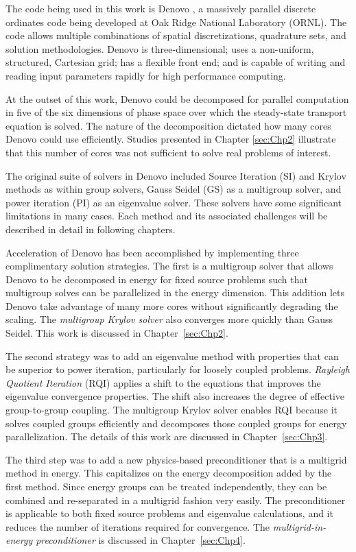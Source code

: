 The code being used in this work is Denovo \cite{Evans2009}, a massively parallel discrete ordinates code being developed at Oak Ridge National Laboratory (ORNL). The code allows multiple combinations of spatial discretizations, quadrature sets, and solution methodologies. Denovo is three-dimensional; uses a non-uniform, structured, Cartesian grid; has a flexible front end; and is capable of writing and reading input parameters rapidly for high performance computing. 

At the outset of this work, Denovo could be decomposed for parallel computation in five of the six dimensions of phase space over which the steady-state transport equation is solved. The nature of the decomposition dictated how many cores Denovo could use efficiently. Studies presented in Chapter \ref{sec:Chp2} illustrate that this number of cores was not sufficient to solve real problems of interest. 

The original suite of solvers in Denovo included Source Iteration (SI) and Krylov methods as within group solvers, Gauss Seidel (GS) as a multigroup solver, and power iteration (PI) as an eigenvalue solver. These solvers have some significant limitations in many cases. Each method and its associated challenges will be described in detail in following chapters. 

Acceleration of Denovo has been accomplished by implementing three complimentary solution strategies. The first is a multigroup solver that allows Denovo to be decomposed in energy for fixed source problems such that multigroup solves can be parallelized in the energy dimension. This addition lets Denovo take advantage of many more cores without significantly degrading the scaling. The \emph{multigroup Krylov solver} also converges more quickly than Gauss Seidel. This work is discussed in Chapter~\ref{sec:Chp2}.

The second strategy was to add an eigenvalue method with properties that can be superior to power iteration, particularly for loosely coupled problems. \emph{Rayleigh Quotient Iteration} (RQI) applies a shift to the equations that improves the eigenvalue convergence properties. The shift also increases the degree of effective group-to-group coupling. The multigroup Krylov solver enables RQI because it solves coupled groups efficiently and decomposes those coupled groups for energy parallelization. The details of this work are discussed in Chapter~\ref{sec:Chp3}.

The third step was to add a new physics-based preconditioner that is a multigrid method in energy. This capitalizes on the energy decomposition added by the first method. Since energy groups can be treated independently, they can be combined and re-separated in a multigrid fashion very easily. The preconditioner is applicable to both fixed source problems and eigenvalue calculations, and it reduces the number of iterations required for convergence. The \emph{multigrid-in-energy preconditioner} is discussed in Chapter~\ref{sec:Chp4}.

